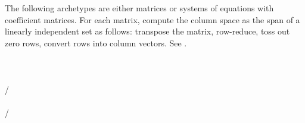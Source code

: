 The following archetypes are either matrices or systems of equations with coefficient matrices.  For each matrix, compute the column space as the span of a linearly independent set as follows: transpose the matrix, row-reduce, toss out zero rows, convert rows into column vectors. See .\\
\\ 
\\ 
\\ 
/\\ 
\\ 
/\\ 
\\
\\
%
\\
\\


